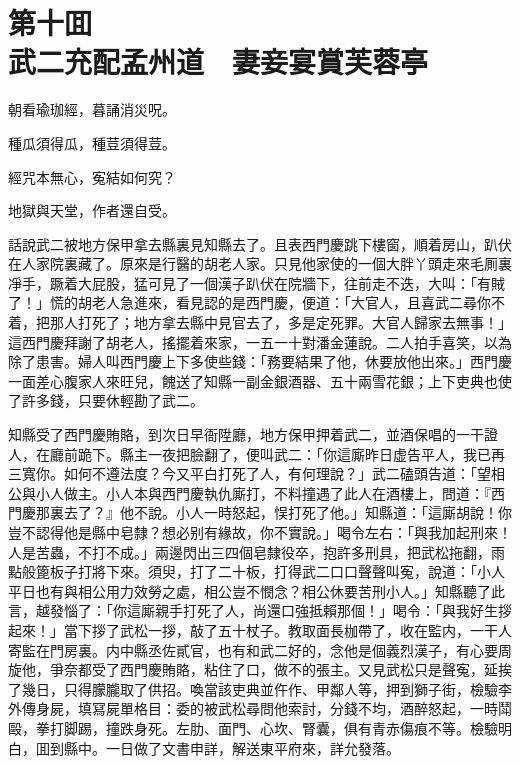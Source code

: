 
\chapter*{第十囬　\\武二充配孟州道　妻妾宴賞芙蓉亭}
\thispagestyle{empty}

\begin{myquote}
朝看瑜珈經，暮誦消災呪。

種瓜須得瓜，種荳須得荳。

經咒本無心，寃結如何究？

地獄與天堂，作者還自受。
\end{myquote}

話說武二被地方保甲拿去縣裏見知縣去了。且表西門慶跳下樓窗，順着房山，趴伏在人家院裏藏了。原來是行醫的胡老人家。只見他家使的一個大胖丫頭走來毛厠裏凈手，蹶着大屁股，猛可見了一個漢子趴伏在院牆下，往前走不迭，大叫：「有賊了！」慌的胡老人急進來，看見認的是西門慶，便道：「大官人，且喜武二尋你不着，把那人打死了；地方拿去縣中見官去了，多是定死罪。大官人歸家去無事！」這西門慶拜謝了胡老人，搖擺着來家，一五一十對潘金蓮說。二人拍手喜笑，以為除了患害。婦人叫西門慶上下多使些錢：「務要結果了他，休要放他出來。」西門慶一面差心腹家人來旺兒，餽送了知縣一副金銀酒器、五十兩雪花銀；上下吏典也使了許多錢，只要休輕勘了武二。

知縣受了西門慶賄賂，到次日早衙陞廳，地方保甲押着武二，並酒保唱的一干證人，在廳前跪下。縣主一夜把臉翻了，便叫武二：「你這廝昨日虚告平人，我已再三寬你。如何不遵法度？今又平白打死了人，有何理說？」武二磕頭告道：「望相公與小人做主。小人本與西門慶執仇廝打，不料撞遇了此人在酒樓上，問道：『西門慶那裏去了？』他不說。小人一時怒起，悮打死了他。」知縣道：「這廝胡說！你豈不認得他是縣中皂隸？想必别有緣故，你不實說。」喝令左右：「與我加起刑來！人是苦蟲，不打不成。」兩邊閃出三四個皂隸役卒，抱許多刑具，把武松拖翻，雨點般篦板子打將下來。須臾，打了二十板，打得武二口口聲聲叫寃，說道：「小人平日也有與相公用力效勞之處，相公豈不憫念？相公休要苦刑小人。」知縣聽了此言，越發惱了：「你這廝親手打死了人，尚還口強抵賴那個！」喝令：「與我好生拶起來！」當下拶了武松一拶，敲了五十杖子。教取面長枷帶了，收在監内，一干人寄監在門房裏。内中縣丞佐貳官，也有和武二好的，念他是個義烈漢子，有心要周旋他，爭奈都受了西門慶賄賂，粘住了口，做不的張主。又見武松只是聲寃，延挨了幾日，只得朦朧取了供招。喚當該吏典並仵作、甲鄰人等，押到獅子街，檢驗李外傳身屍，填冩屍單格目：委的被武松尋問他索討，分錢不均，酒醉怒起，一時鬦毆，拳打脚踢，撞跌身死。左肋、面門、心坎、腎囊，俱有青赤傷痕不等。檢驗明白，囬到縣中。一日做了文書申詳，解送東平府來，詳允發落。

